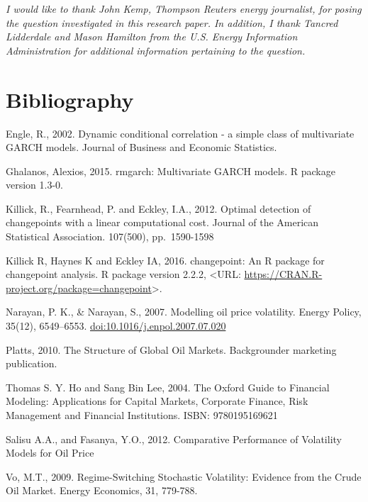 \documentclass[]{article}
\begin{document}
\emph{I would like to thank John Kemp, Thompson Reuters energy
journalist, for posing the question investigated in this research paper.
In addition, I thank Tancred Lidderdale and Mason Hamilton from the U.S.
Energy Information Administration for additional information pertaining
to the question.}

\section{Bibliography}\label{bibliography}

Engle, R., 2002. Dynamic conditional correlation - a simple class of
multivariate GARCH models. Journal of Business and Economic Statistics.

Ghalanos, Alexios, 2015. rmgarch: Multivariate GARCH models. R package
version 1.3-0.

Killick, R., Fearnhead, P. and Eckley, I.A., 2012. Optimal detection of
changepoints with a linear computational cost. Journal of the American
Statistical Association. 107(500), pp.~1590-1598

Killick R, Haynes K and Eckley IA, 2016. changepoint: An R package for
changepoint analysis. R package version 2.2.2, \textless{}URL:
\url{https://CRAN.R-project.org/package=changepoint}\textgreater{}.

Narayan, P. K., \& Narayan, S., 2007. Modelling oil price volatility.
Energy Policy, 35(12), 6549--6553. \url{doi:10.1016/j.enpol.2007.07.020}

Platts, 2010. The Structure of Global Oil Markets. Backgrounder
marketing publication.

Thomas S. Y. Ho and Sang Bin Lee, 2004. The Oxford Guide to Financial
Modeling: Applications for Capital Markets, Corporate Finance, Risk
Management and Financial Institutions. ISBN: 9780195169621

Salisu A.A., and Fasanya, Y.O., 2012. Comparative Performance of
Volatility Models for Oil Price

Vo, M.T., 2009. Regime-Switching Stochastic Volatility: Evidence from
the Crude Oil Market. Energy Economics, 31, 779-788.
\end{document}
